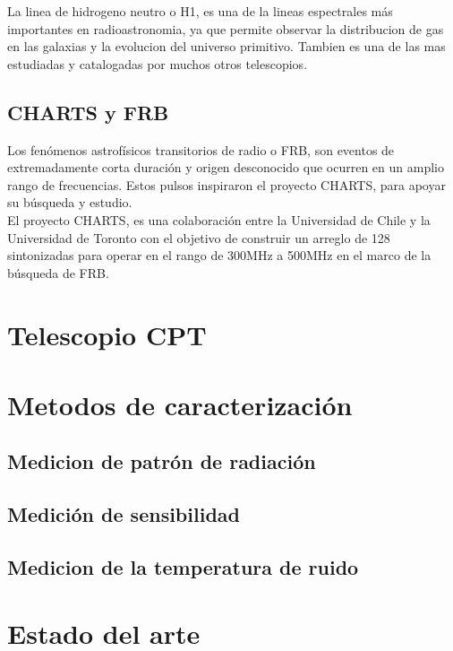 La linea de hidrogeno neutro o H1, es una de la lineas espectrales más importantes en radioastronomia, ya que permite observar la distribucion de gas en las galaxias y la evolucion del universo primitivo. Tambien es una de las mas estudiadas y catalogadas por muchos otros telescopios.\\

\subsection{CHARTS y FRB}

Los fenómenos astrofísicos transitorios de radio o FRB, son eventos de extremadamente corta duración y origen desconocido que ocurren en un amplio rango de frecuencias. Estos pulsos inspiraron el proyecto CHARTS, para apoyar su búsqueda y estudio.\\

El proyecto CHARTS, es una colaboración entre la Universidad de Chile y la Universidad de Toronto con el objetivo de construir un arreglo de 128 sintonizadas para operar en el rango de 300MHz a 500MHz en el marco de la búsqueda de FRB.\\


\section{Telescopio CPT}



\section{Metodos de caracterización}

\subsection{Medicion de patrón de radiación}

\subsection{Medición de sensibilidad}

\subsection{Medicion de la temperatura de ruido}

\section{Estado del arte}





